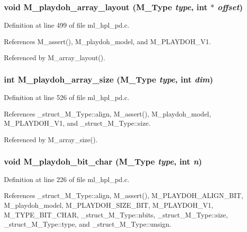 \subsubsection{\setlength{\rightskip}{0pt plus 5cm}void M\_\-playdoh\_\-array\_\-layout (\bf{M\_\-Type} {\em type}, int $\ast$ {\em offset})}\label{ml__hpl__pd_8c_df0539c60f634f095d4112740198ae1d}




Definition at line 499 of file ml\_\-hpl\_\-pd.c.

References M\_\-assert(), M\_\-playdoh\_\-model, and M\_\-PLAYDOH\_\-V1.

Referenced by M\_\-array\_\-layout().
\subsubsection{\setlength{\rightskip}{0pt plus 5cm}int M\_\-playdoh\_\-array\_\-size (\bf{M\_\-Type} {\em type}, int {\em dim})}\label{ml__hpl__pd_8c_c99a547b6d78ec0af0e0a2ccf5c96230}




Definition at line 526 of file ml\_\-hpl\_\-pd.c.

References \_\-struct\_\-M\_\-Type::align, M\_\-assert(), M\_\-playdoh\_\-model, M\_\-PLAYDOH\_\-V1, and \_\-struct\_\-M\_\-Type::size.

Referenced by M\_\-array\_\-size().
\subsubsection{\setlength{\rightskip}{0pt plus 5cm}void M\_\-playdoh\_\-bit\_\-char (\bf{M\_\-Type} {\em type}, int {\em n})}\label{ml__hpl__pd_8c_387e78103b37cacc598646f50a2577e6}




Definition at line 226 of file ml\_\-hpl\_\-pd.c.

References \_\-struct\_\-M\_\-Type::align, M\_\-assert(), M\_\-PLAYDOH\_\-ALIGN\_\-BIT, M\_\-playdoh\_\-model, M\_\-PLAYDOH\_\-SIZE\_\-BIT, M\_\-PLAYDOH\_\-V1, M\_\-TYPE\_\-BIT\_\-CHAR, \_\-struct\_\-M\_\-Type::nbits, \_\-struct\_\-M\_\-Type::size, \_\-struct\_\-M\_\-Type::type, and \_\-struct\_\-M\_\-Type::unsign.

